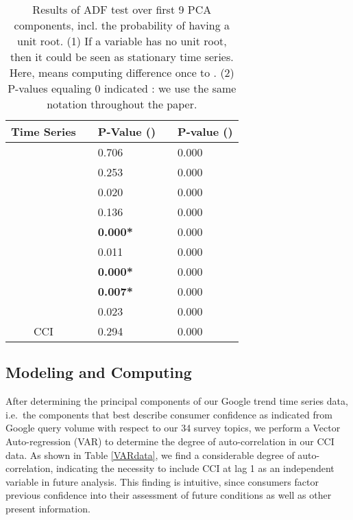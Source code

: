 \documentclass[10pt]{article}
\begin{document}
\begin{table}
	\begin{center}
	\begin{tabular}{cp{1.5cm}lp{1.5cm}l}
	\hline
      	Time Series	&		        &	P-Value ()  &                & P-value () \\   
		 \hline
		&	         	&	0.706               &        	&	0.000                     \\
		&			&	0.253               &        	&	0.000                     \\  
		&			&	0.020               &        	&	0.000                     \\  
		&			&	0.136               &        	&	0.000                     \\  
		&	 		&	\textbf{0.000*}  &         	&	0.000                     \\ 
		&	  		&	0.011                &         	&	0.000                     \\
		&			&	\textbf{0.000* } &         	&	0.000                     \\
		&	  		&	\textbf{0.007* } &        	&	0.000                     \\ 
		&			&	0.023                &         	&	0.000                     \\
	  CCI        &			&	0.294                &        	&	0.000                     \\ 
	\hline

	\end{tabular}
	\caption{\label{ADF test} Results of ADF test over first 9 PCA components, incl. the probability of having a unit root. (1)  If a variable has no unit root, then it could be seen as stationary time series. Here,  means computing difference once to . (2) P-values equaling 0 indicated : we use the same notation throughout the paper.}
\end{center}

\end{table}


\subsection*{Modeling  and Computing}

After determining the principal components of our Google trend time series data, i.e.~the components that best describe consumer confidence as indicated from Google query volume with respect to our 34 survey topics, we perform a  Vector Auto-regression (VAR) \cite{Sims1980} to determine the degree of auto-correlation in our CCI data. As shown in Table \ref{VARdata}, we find a considerable degree of auto-correlation, indicating the necessity to include CCI at lag 1 as an independent variable in future analysis. This finding is intuitive, since consumers factor previous confidence into their assessment of future conditions as well as other present information.\\
\end{document}
